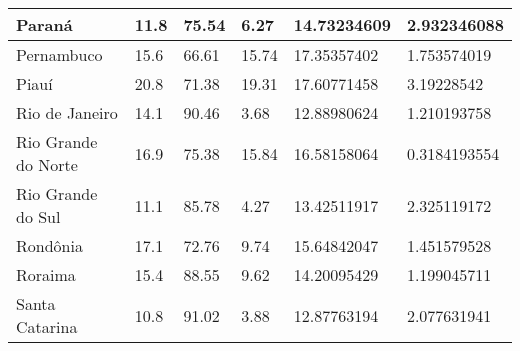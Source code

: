 \begin{table}[h]
{\begin{tabular}{|l|l|l|l|l|l|}
Paraná              & 11.8                                              & 75.54                                   & 6.27                                       & 14.73234609                                        & 2.932346088               \\ \hline
Pernambuco          & 15.6                                              & 66.61                                   & 15.74                                      & 17.35357402                                        & 1.753574019               \\ \hline
Piauí               & 20.8                                              & 71.38                                   & 19.31                                      & 17.60771458                                        & 3.19228542                \\ \hline
Rio de Janeiro      & 14.1                                              & 90.46                                   & 3.68                                       & 12.88980624                                        & 1.210193758               \\ \hline
Rio Grande do Norte & 16.9                                              & 75.38                                   & 15.84                                      & 16.58158064                                        & 0.3184193554              \\ \hline
Rio Grande do Sul   & 11.1                                              & 85.78                                   & 4.27                                       & 13.42511917                                        & 2.325119172               \\ \hline
Rondônia            & 17.1                                              & 72.76                                   & 9.74                                       & 15.64842047                                        & 1.451579528               \\ \hline
Roraima             & 15.4                                              & 88.55                                   & 9.62                                       & 14.20095429                                        & 1.199045711               \\ \hline
Santa Catarina      & 10.8                                              & 91.02                                   & 3.88                                       & 12.87763194                                        & 2.077631941               \\ \hline

\end{tabular}}
\end{table}
